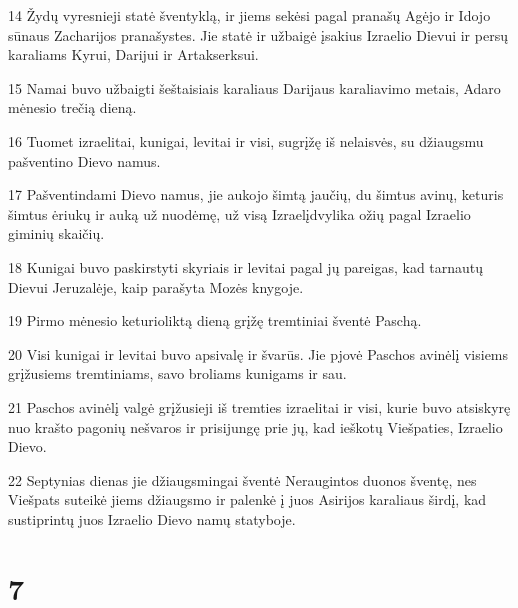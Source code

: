 \par 14 Žydų vyresnieji statė šventyklą, ir jiems sekėsi pagal pranašų Agėjo ir Idojo sūnaus Zacharijos pranašystes. Jie statė ir užbaigė įsakius Izraelio Dievui ir persų karaliams Kyrui, Darijui ir Artakserksui. 
\par 15 Namai buvo užbaigti šeštaisiais karaliaus Darijaus karaliavimo metais, Adaro mėnesio trečią dieną. 
\par 16 Tuomet izraelitai, kunigai, levitai ir visi, sugrįžę iš nelaisvės, su džiaugsmu pašventino Dievo namus. 
\par 17 Pašventindami Dievo namus, jie aukojo šimtą jaučių, du šimtus avinų, keturis šimtus ėriukų ir auką už nuodėmę, už visą Izraelį­dvylika ožių pagal Izraelio giminių skaičių. 
\par 18 Kunigai buvo paskirstyti skyriais ir levitai pagal jų pareigas, kad tarnautų Dievui Jeruzalėje, kaip parašyta Mozės knygoje. 
\par 19 Pirmo mėnesio keturioliktą dieną grįžę tremtiniai šventė Paschą. 
\par 20 Visi kunigai ir levitai buvo apsivalę ir švarūs. Jie pjovė Paschos avinėlį visiems grįžusiems tremtiniams, savo broliams kunigams ir sau. 
\par 21 Paschos avinėlį valgė grįžusieji iš tremties izraelitai ir visi, kurie buvo atsiskyrę nuo krašto pagonių nešvaros ir prisijungę prie jų, kad ieškotų Viešpaties, Izraelio Dievo. 
\par 22 Septynias dienas jie džiaugsmingai šventė Neraugintos duonos šventę, nes Viešpats suteikė jiems džiaugsmo ir palenkė į juos Asirijos karaliaus širdį, kad sustiprintų juos Izraelio Dievo namų statyboje.



\chapter{7}


